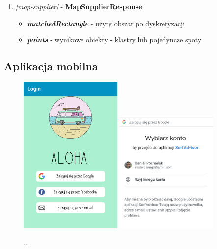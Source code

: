 \begin{enumerate}
    \item
    \large\emph{[map-supplier]} - \textbf{MapSupplierResponse}\normalsize
    \begin{itemize}
        \item
        \textbf{\emph{matchedRectangle}} - użyty obszar po dyskretyzacji

        \item
        \textbf{\emph{points}} - wynikowe obiekty - klastry lub pojedyncze spoty

    \end{itemize} 
    
\end{enumerate}

\pagebreak

\subsection{Aplikacja mobilna}

\begin{figure}[h!]
	\begin{center}
		\includegraphics[width=0.45\textwidth]{img/mobile/login}
		\hspace{5mm}
		\includegraphics[width=0.45\textwidth]{img/mobile/google}
	\end{center}
	\caption{...}
\end{figure}


